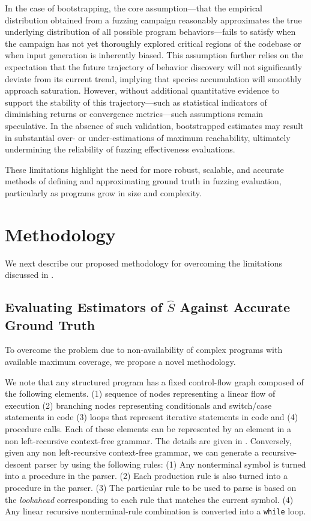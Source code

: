 \documentclass[conference]{IEEEtran}
\begin{document}
In the case of bootstrapping, the core assumption—that the empirical distribution obtained from a fuzzing campaign reasonably approximates the true underlying distribution of all possible program behaviors—fails to satisfy when the campaign has not yet thoroughly explored critical regions of the codebase or when input generation is inherently biased. This assumption further relies on the expectation that the future trajectory of behavior discovery will not significantly deviate from its current trend, implying that species accumulation will smoothly approach saturation. However, without additional quantitative evidence to support the stability of this trajectory—such as statistical indicators of diminishing returns or convergence metrics—such assumptions remain speculative. In the absence of such validation, bootstrapped estimates may result in substantial over- or under-estimations of maximum reachability, ultimately undermining the reliability of fuzzing effectiveness evaluations.  

These limitations highlight the need for more robust, scalable, and accurate methods of defining and approximating ground truth in fuzzing evaluation, particularly as programs grow in size and complexity.

\section{Methodology} \label{sec:method}
We next describe our proposed methodology for overcoming the limitations discussed in .
\subsection{Evaluating Estimators of \texorpdfstring{$\hat{S}$}{S-hat} Against Accurate Ground Truth}
To overcome the problem due to non-availability of complex programs with available
maximum coverage, we propose a novel methodology.

We note that any structured program has a fixed control-flow graph composed of
the following elements. (1) sequence of nodes representing a linear flow of execution (2) branching nodes
representing conditionals and switch/case statements in code (3) loops that represent iterative statements
in code and (4) procedure calls. Each of these elements can be represented by
an element in a non left-recursive context-free grammar. The details are given in .
Conversely, given any non left-recursive context-free grammar, we can generate a
recursive-descent parser by using the following rules:
(1) Any nonterminal symbol is turned into a procedure in the parser.
(2) Each production rule is also turned into a procedure in the parser.
(3) The particular rule to be used to parse is based on the \emph{lookahead}
corresponding to each rule that matches the current symbol.
(4) Any linear recursive nonterminal-rule combination is converted into a \texttt{while} loop.
\end{document}
